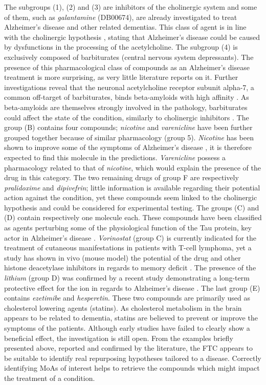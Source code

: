 \documentclass{bioinfo}
\begin{document}
The subgroups (1), (2) and (3) are inhibitors of the cholinergic system and some of them, such as \emph{galantamine} (DB00674), are already 
investigated to treat Alzheimer's disease and other related dementias. This class of agent is in line with the 
cholinergic hypothesis \citep{Francis1999}, stating that Alzheimer's disease could be caused by dysfunctions in the processing of the
acetylcholine. The subgroup (4) is exclusively composed of barbiturates (central nervous system depressants). 
The presence of this pharmacological class of compounds as an Alzheimer's disease treatment is more surprising, as very little 
literature reports on it. Further investigations reveal that the neuronal acetylcholine receptor subunit alpha-7, a 
common off-target of barbiturates, binds beta-amyloids with high affinity \citep{Wang2000}. As beta-amyloids are themselves strongly involved 
in the pathology, barbiturates could affect the state of the condition, similarly to cholinergic inhibitors \citep{Wang2000}.
The group (B) contains four compounds; \emph{nicotine} and \emph{varenicline} have been further grouped together because of 
similar pharmacology (group 5).
\emph{Nicotine} has been shown to improve some of the symptoms of Alzheimer's disease \citep{Jones1992}, it is therefore expected to 
find this molecule in the predictions. \emph{Varenicline} possess a pharmacology related to that of \emph{nicotine}, which would explain 
the presence of the drug in this category. The two remaining drugs of group F are respectively \emph{pralidoxime} and \emph{dipivefrin}; 
little information is available regarding their potential action against the condition, yet these compounds seem linked to the 
cholinergic hypothesis and could be considered for experimental testing.
The groups (C) and (D) contain respectively one molecule each. These compounds have been classified as agents perturbing some of 
the physiological function of the Tau protein, key actor in Alzheimer's 
disease \citep{Grundke-Iqbal1986}. \emph{Vorinostat} (group C) is currently 
indicated for the treatment of cutaneous manifestations in patients with T-cell lymphoma, yet a study has 
shown in vivo (mouse model) the potential of the drug and other histone deacetylase inhibitors in regards to memory 
deficit \citep{Kilgore2010}. 
The presence of the \emph{lithium} (group D) was 
confirmed by a recent study demonstrating a long-term 
protective effect for the ion in regards to Alzheimer's disease \citep{Young2011}. The last group (E) contains 
\emph{ezetimibe} and \emph{hesperetin}. These two compounds are primarily used as cholesterol lowering agents (statins). As cholesterol 
metabolism in the brain appears to be related to dementia, statins are believed to prevent or improve the symptoms of the 
patients. Although early studies \citep{Wolozin2004} have failed to clearly show a beneficial effect, the investigation is still open.
From the examples briefly presented above, reported and confirmed by the literature, the FTC appears to be suitable to 
identify real repurposing hypotheses tailored to a disease. Correctly 
identifying MoAs of interest helps to retrieve the compounds which might impact 
the treatment of a condition.
\end{document}
